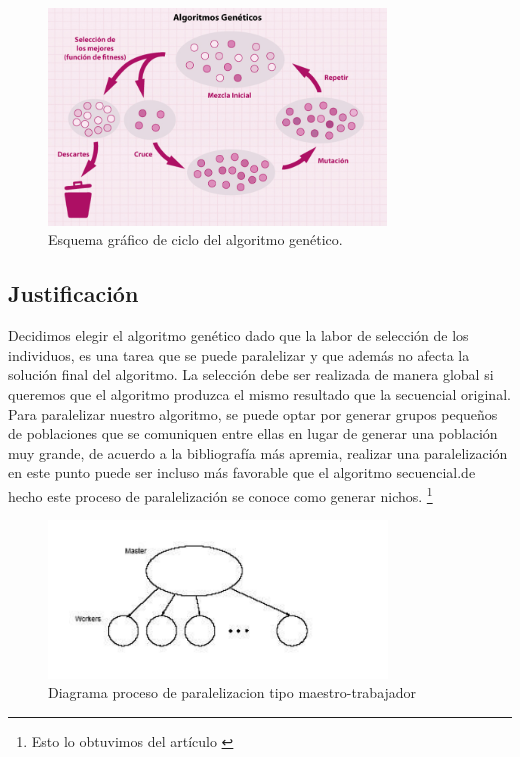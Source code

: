 \documentclass{article}
\begin{document}
\begin{figure}[htb]
\begin{center}
\leavevmode

\includegraphics[width=0.8\textwidth]{ALGORITMOGENETICO2.png}   
\end{center}
\caption{Esquema gráfico de ciclo del algoritmo genético.}
\label{fig:awesome_image}
\end{figure}

\subsection{Justificación}
Decidimos elegir el algoritmo genético dado que la labor de selección de los individuos, es una tarea que se puede paralelizar y que además no afecta la solución final del algoritmo. La selección debe ser realizada de manera global si queremos que el algoritmo produzca el mismo resultado que la secuencial original. Para paralelizar nuestro algoritmo, se puede optar por generar grupos pequeños de poblaciones que se comuniquen entre ellas en lugar de generar una población muy grande, de acuerdo a la bibliografía más apremia, realizar una paralelización en este punto puede ser incluso más favorable que el algoritmo secuencial.de hecho este proceso de paralelización se conoce como generar nichos.  \footnote{Esto lo obtuvimos del artículo \cite{S. Poddar, 2020} }
\begin{figure}[h!]
    \centering
    \includegraphics[width=9cm]{imgs/AGP.png}
    \caption{Diagrama proceso de paralelizacion tipo maestro-trabajador}
    \label{fig:my_label}
\end{figure} 
\end{document}
